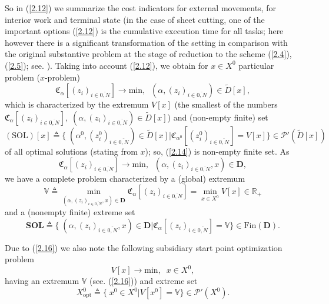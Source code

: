 \documentclass[numbers,sort&compress]{IntechOpen-Book}%
\begin{document}
So in  (\ref{2.12})
we summarize the cost indicators for external movements,
for interior work and terminal state
(in the case of sheet cutting,
one of the important options  (\ref{2.12})
is the cumulative execution time for all tasks;
here however
there is a significant transformation of the setting
in comparison with the original substantive problem
at the stage of reduction to the scheme
 (\ref{2.4}),  (\ref{2.5});
see. \cite[$\S$3.3]{4}).
Taking into account  (\ref{2.12}),
we obtain for
$ x \in X ^ 0 $
particular problem
($ x $-problem)
\begin{equation}\label{2.13}
  \mathfrak{C}_{\alpha}[(z_i)_{i \in \overline{0,N}}] \longrightarrow
  \mathrm{min},\;\;(\alpha,(z_i)_{i \in \overline{0,N}}) \in \tilde{D}[x],
\end{equation}
which is characterized by the extremum
$V[x]$
(the smallest of the numbers
$\mathfrak{C}_{\alpha}[(z_i)_{i \in \overline{0,N}}],\;(\alpha,(z_i)_{i \in \overline{0,N}}) \in \tilde{D}[x]$)
and
(non-empty finite)
set
\begin{equation}\label{2.14}
  (\mathrm{SOL})[x] {\triangleq}
  \{\;(\alpha^0,(z_i^0)_{i \in \overline{0,N}}) \in \tilde{D}[x] \vert
  \mathfrak{C}_{\alpha^0}[(z_i^0)_{i \in \overline{0,N}}] = V[x]\} \in \mathcal{P}'(\tilde{D}[x])
\end{equation}
of all optimal solutions
(stating from $x$);
so,
 (\ref{2.14})
is non-empty finite set.
As
\begin{equation}\label{2.15}
  \mathfrak{C}_{\alpha}[(z_i)_{i \in \overline{0,N}}] \longrightarrow
  \mathrm{min},\;\;(\alpha,(z_i)_{i \in \overline{0,N}},x) \in \mathbf{D},
\end{equation}
we have a complete problem characterized by a (global) extremum
\begin{equation}\label{2.16}
  \mathbb{V} {\triangleq}
  \min\limits_{(\alpha,(z_i)_{i \in \overline{0,N}},x) \in
  \mathbf{D}}\mathfrak{C}_{\alpha}[(z_i)_{i \in \overline{0,N}}]
  = \min\limits_{x \in X^0} V[x] \in \mathbb{R}_+
\end{equation}
and a (nonempty finite) extreme set
\begin{equation}\label{2.17}
  \mathbf{SOL} {\triangleq}
  \{\;(\alpha,(z_i)_{i \in \overline{0,N}},x) \in \mathbf{D}
  \vert \mathfrak{C}_{\alpha}[(z_i)_{i \in \overline{0,N}}] =
  \mathbb{V}\} \in \mathrm{Fin}(\mathbf{D}).
\end{equation}

Due to  (\ref{2.16})
we also note the following
subsidiary
start point optimization problem
\begin{equation}\label{2.18}
  V[x] \longrightarrow \mathrm{min},\;\;x \in X^0,
\end{equation}
having an extremum
$\mathbb{V}$
(see.  (\ref{2.16}))
and extreme set
\begin{equation}\label{2.19}
  X^0_{\mathrm{opt}} {\triangleq} \{\;x^0 \in X^0 \vert V[x^0] = \mathbb{V}\} \in \mathcal{P}'(X^0).
\end{equation}
\end{document}
